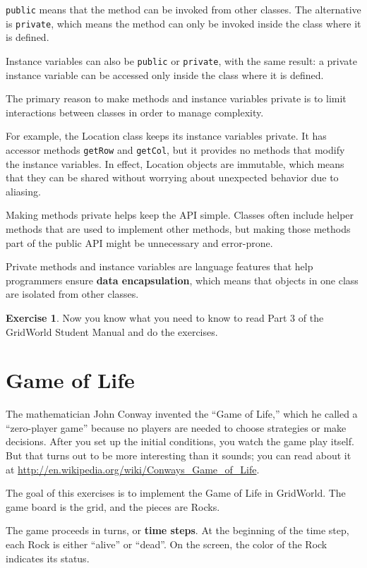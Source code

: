 \documentclass[12pt]{book}
\theoremstyle{definition}
\newtheorem{excz}{Exercise}[chapter]
\newenvironment{exercise}{\bigskip\begin{excz}\mbox{}}{\end{excz}}
\begin{document}
{\tt public} means that the method can be invoked from other classes.
The alternative is {\tt private}, which means the method can only
be invoked inside the class where it is defined.

Instance variables can also be {\tt public} or {\tt private}, with
the same result: a private instance variable can be accessed only
inside the class where it is defined.

The primary reason to make methods and instance variables private
is to limit interactions between classes in order to manage
complexity.

For example, the Location class keeps its instance variables private.
It has accessor methods {\tt getRow} and {\tt getCol}, but it provides
no methods that modify the instance variables.  In effect, Location
objects are immutable, which means that they can be shared without
worrying about unexpected behavior due to aliasing.

Making methods private helps keep the API simple.  Classes often
include helper methods that are used to implement other methods, but
making those methods part of the public API might be unnecessary
and error-prone.

Private methods and instance variables are language features
that help programmers ensure {\bf data encapsulation}, which means
that objects in one class are isolated from other classes.

\begin{exercise}
Now you know what you need to know to 
read Part 3 of the
GridWorld Student Manual and do the exercises.
\end{exercise}


\section{Game of Life}

The mathematician John Conway invented
the ``Game of Life,'' which he called a ``zero-player game''
because no players are needed to choose strategies or make decisions.
After you set up the initial conditions, you watch the game
play itself.  But that turns out to be more interesting than it sounds;
you can read about it at
\url{http://en.wikipedia.org/wiki/Conways_Game_of_Life}.

The goal of this exercises is to implement the Game of Life in
GridWorld.  The game board is the grid, and the pieces are Rocks.

The game proceeds in turns, or {\bf time steps}.  At the beginning
of the time step, each Rock is either ``alive'' or ``dead''.  On the
screen, the color of the Rock indicates its status.
\end{document}
